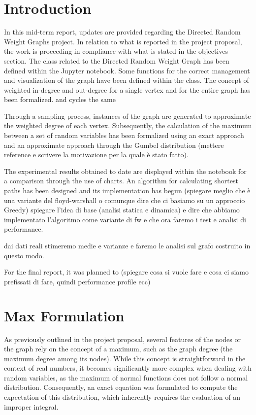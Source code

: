 \section{Introduction}
In this mid-term report, updates are provided regarding the Directed Random Weight Graphs project. In relation to what is reported in the project proposal, the work is proceeding in compliance with what is stated in the objectives section. 
The class related to the Directed Random Weight Graph has been defined within the Jupyter notebook. Some functions for the correct management and visualization of the graph have been defined within the class.
The concept of weighted in-degree and out-degree for a single vertex and for the entire graph has been formalized.
and cycles the same

Through a sampling process, instances of the graph are generated to approximate the weighted degree of each vertex.
Subsequently, the calculation of the maximum between a set of random variables has been formalized using an exact approach and an approximate approach through the Gumbel distribution (mettere reference e scrivere la motivazione per la quale è stato fatto). 

The experimental results obtained to date are displayed within the notebook for a comparison through the use of charts. 
An algorithm for calculating shortest paths has been designed and its implementation has begun (spiegare meglio che è una variante del floyd-warshall o comunque dire che ci basiamo su un approccio Greedy) 
spiegare l'idea di base (analisi statica e dinamica) e dire che abbiamo implementato l'algoritmo come variante di fw e che ora faremo i test e analisi di performance.

dai dati reali stimeremo medie e varianze e faremo le analisi sul grafo costruito in questo modo.

For the final report, it was planned to (spiegare cosa si vuole fare e cosa ci siamo prefissati di fare, quindi performance profile ecc) 

\section{Max Formulation}
As previously outlined in the project proposal, several features of the nodes or the graph rely on the concept of a maximum, such as the graph degree (the maximum degree among its nodes). While this concept is straightforward in the context of real numbers, it becomes significantly more complex when dealing with random variables, as the maximum of normal functions does not follow a normal distribution. Consequently, an exact equation was formulated to compute the expectation of this distribution, which inherently requires the evaluation of an improper integral.

